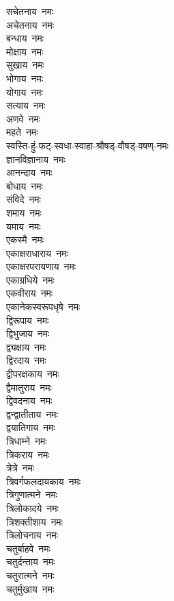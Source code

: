 \begin{multicols}{2}
\begin{flushleft}
सचेतनाय~नमः\\
अचेतनाय~नमः\\
बन्धाय~नमः\\
मोक्षाय~नमः\hfill{}\\
सुखाय~नमः\\
भोगाय~नमः\\
योगाय~नमः\\
सत्याय~नमः\\
अणवे~नमः\\
महते~नमः\\
स्वस्ति-हुं-फट्-स्वधा-स्वाहा-श्रौषड्-वौषड्-वषण्-नमः\\
ज्ञानविज्ञानाय~नमः\\
आनन्दाय~नमः\\
बोधाय~नमः\hfill{}\\
संविदे~नमः\\
शमाय~नमः\\
यमाय~नमः\\
एकस्मै~नमः\\
एकाक्षराधाराय~नमः\\
एकाक्षरपरायणाय~नमः\\
एकाग्रधिये~नमः\\
एकवीराय~नमः\\
एकानेकस्वरूपधृषे~नमः\\
द्विरूपाय~नमः\hfill{}\\
द्विभुजाय~नमः\\
द्व्यक्षाय~नमः\\
द्विरदाय~नमः\\
द्वीपरक्षकाय~नमः\\
द्वैमातुराय~नमः\\
द्विवदनाय~नमः\\
द्वन्द्वातीताय~नमः\\
द्वयातिगाय~नमः\\
त्रिधाम्ने~नमः\\
त्रिकराय~नमः\hfill{}\\
त्रेत्रे~नमः\\
त्रिवर्गफलदायकाय~नमः\\
त्रिगुणात्मने~नमः\\
त्रिलोकादये~नमः\\
त्रिशक्तीशाय~नमः\\
त्रिलोचनाय~नमः\\
चतुर्बाहवे~नमः\\
चतुर्दन्ताय~नमः\\
चतुरात्मने~नमः\\
चतुर्मुखाय~नमः\hfill{}\\

\end{flushleft}
\end{multicols}
